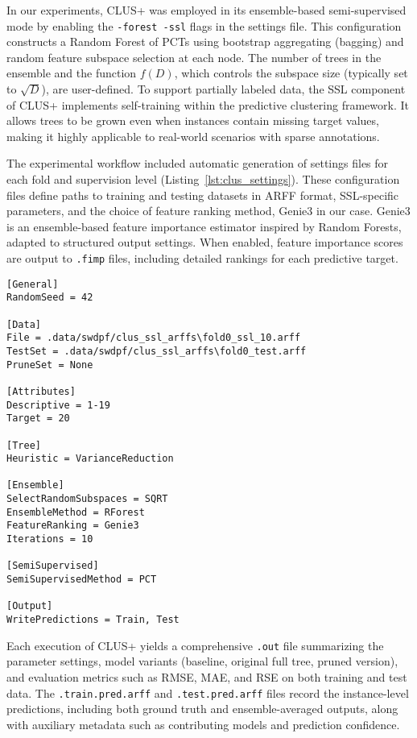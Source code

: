 In our experiments, CLUS+ was employed in its ensemble-based semi-supervised mode by enabling the \texttt{-forest -ssl} flags in the settings file. This configuration constructs a Random Forest of PCTs using bootstrap aggregating (bagging) and random feature subspace selection at each node. The number of trees in the ensemble and the function $f(D)$, which controls the subspace size (typically set to $\sqrt{D}$), are user-defined. To support partially labeled data, the SSL component of CLUS+ implements self-training within the predictive clustering framework. It allows trees to be grown even when instances contain missing target values, making it highly applicable to real-world scenarios with sparse annotations.

The experimental workflow included automatic generation of settings files for each fold and supervision level (Listing~\ref{lst:clus_settings}). These configuration files define paths to training and testing datasets in ARFF format, SSL-specific parameters, and the choice of feature ranking method, Genie3 in our case. Genie3 is an ensemble-based feature importance estimator inspired by Random Forests, adapted to structured output settings. When enabled, feature importance scores are output to \texttt{.fimp} files, including detailed rankings for each predictive target.

\begin{lstlisting}[label=lst:clus_settings, caption=CLUS+ Settings File Example for the Fold0 with 10\% Labeled Data]
[General]
RandomSeed = 42

[Data]
File = .data/swdpf/clus_ssl_arffs\fold0_ssl_10.arff
TestSet = .data/swdpf/clus_ssl_arffs\fold0_test.arff
PruneSet = None

[Attributes]
Descriptive = 1-19
Target = 20

[Tree]
Heuristic = VarianceReduction

[Ensemble]
SelectRandomSubspaces = SQRT
EnsembleMethod = RForest
FeatureRanking = Genie3
Iterations = 10 

[SemiSupervised]
SemiSupervisedMethod = PCT

[Output]
WritePredictions = Train, Test

\end{lstlisting}

Each execution of CLUS+ yields a comprehensive \texttt{.out} file summarizing the parameter settings, model variants (baseline, original full tree, pruned version), and evaluation metrics such as RMSE, MAE, and RSE on both training and test data. The \texttt{.train.pred.arff} and \texttt{.test.pred.arff} files record the instance-level predictions, including both ground truth and ensemble-averaged outputs, along with auxiliary metadata such as contributing models and prediction confidence.

